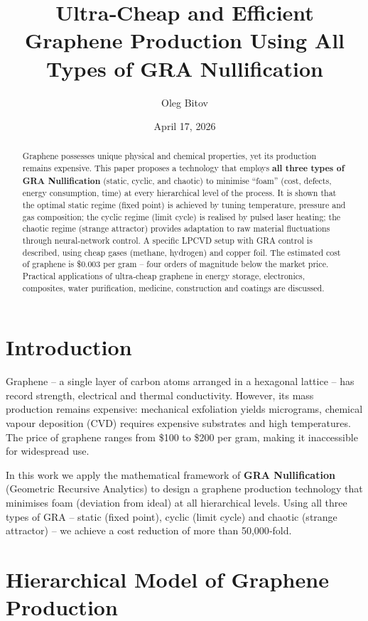 \documentclass[12pt,a4paper]{article}
\title{Ultra‑Cheap and Efficient Graphene Production Using All Types of GRA Nullification}
\author{Oleg Bitov}
\date{April 17, 2026}
\begin{document}
\maketitle

\begin{abstract}
Graphene possesses unique physical and chemical properties, yet its production remains expensive. This paper proposes a technology that employs \textbf{all three types of GRA Nullification} (static, cyclic, and chaotic) to minimise “foam” (cost, defects, energy consumption, time) at every hierarchical level of the process. It is shown that the optimal static regime (fixed point) is achieved by tuning temperature, pressure and gas composition; the cyclic regime (limit cycle) is realised by pulsed laser heating; the chaotic regime (strange attractor) provides adaptation to raw material fluctuations through neural‑network control. A specific LPCVD setup with GRA control is described, using cheap gases (methane, hydrogen) and copper foil. The estimated cost of graphene is \$0.003 per gram – four orders of magnitude below the market price. Practical applications of ultra‑cheap graphene in energy storage, electronics, composites, water purification, medicine, construction and coatings are discussed.
\end{abstract}

\section{Introduction}

Graphene – a single layer of carbon atoms arranged in a hexagonal lattice – has record strength, electrical and thermal conductivity. However, its mass production remains expensive: mechanical exfoliation yields micrograms, chemical vapour deposition (CVD) requires expensive substrates and high temperatures. The price of graphene ranges from \$100 to \$200 per gram, making it inaccessible for widespread use.

In this work we apply the mathematical framework of \textbf{GRA Nullification} (Geometric Recursive Analytics) to design a graphene production technology that minimises foam (deviation from ideal) at all hierarchical levels. Using all three types of GRA – static (fixed point), cyclic (limit cycle) and chaotic (strange attractor) – we achieve a cost reduction of more than 50,000‑fold.

\section{Hierarchical Model of Graphene Production}
\end{document}
